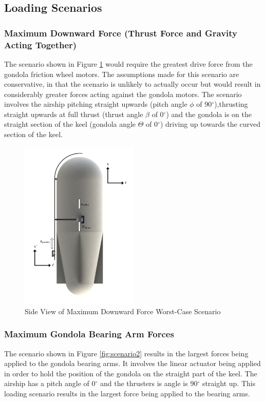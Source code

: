 \documentclass[../main.tex]{subfiles}
\begin{document}
\subsection{Loading Scenarios} \label{loadingScenarios}
\subsubsection*{Maximum Downward Force (Thrust Force and Gravity Acting Together)}
The scenario shown in Figure \ref{fig:scenario1} would require the greatest drive force from the gondola friction wheel motors. The assumptions made for this scenario are conservative, in that the scenario is unlikely to actually occur but would result in considerably greater forces acting against the gondola motors. The scenario involves the airship pitching straight upwards (pitch angle $\phi$ of 90$^{\circ}$),thrusting straight upwards at full thrust (thrust angle $\beta$ of 0$^{\circ}$) and the gondola is on the straight section of the keel (gondola angle $\Theta$ of 0$^{\circ}$) driving up towards the curved section of the keel.

\begin{figure}[H]
	\centering
	\includegraphics[width=0.5\textwidth]{img/analysis/scenario1.pdf}
	\caption{Side View of Maximum Downward Force Worst-Case Scenario}
	\label{fig:scenario1}
\end{figure}

\subsubsection*{Maximum Gondola Bearing Arm Forces}
The scenario shown in Figure \ref{fig:scenario2} results in the largest forces being applied to the gondola bearing arms. It involves the linear actuator being applied in order to hold the position of the gondola on the straight part of the keel. The airship has a pitch angle of 0$^{\circ}$ and the thrusters is angle is 90$^{\circ}$ straight up. This loading scenario results in the largest force being applied to the bearing arms.
\end{document}
